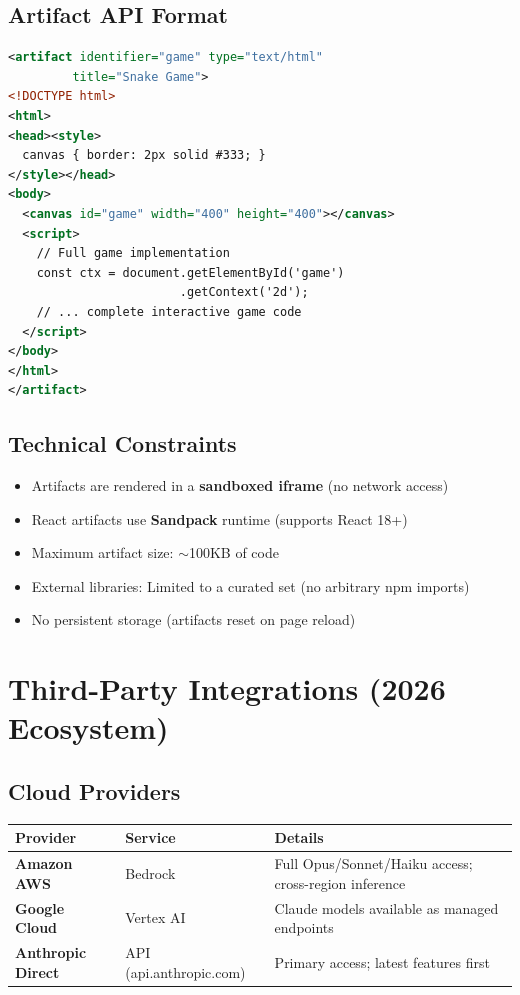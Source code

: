 \documentclass[11pt,a4paper]{article}
\begin{document}
\subsection{Artifact API Format}

\begin{lstlisting}[language=XML, caption={Artifact Generation (in Claude's response)}]
<artifact identifier="game" type="text/html" 
         title="Snake Game">
<!DOCTYPE html>
<html>
<head><style>
  canvas { border: 2px solid #333; }
</style></head>
<body>
  <canvas id="game" width="400" height="400"></canvas>
  <script>
    // Full game implementation
    const ctx = document.getElementById('game')
                        .getContext('2d');
    // ... complete interactive game code
  </script>
</body>
</html>
</artifact>
\end{lstlisting}

\subsection{Technical Constraints}

\begin{itemize}[itemsep=1pt]
  \item Artifacts are rendered in a \textbf{sandboxed iframe} (no network access)
  \item React artifacts use \textbf{Sandpack} runtime (supports React 18+)
  \item Maximum artifact size: $\sim$100KB of code
  \item External libraries: Limited to a curated set (no arbitrary npm imports)
  \item No persistent storage (artifacts reset on page reload)
\end{itemize}

\section{Third-Party Integrations (2026 Ecosystem)}

\subsection{Cloud Providers}

\begin{center}
\begin{tabular}{lL{4cm}L{5cm}}
\toprule
\textbf{Provider} & \textbf{Service} & \textbf{Details} \\
\midrule
\textbf{Amazon AWS} & Bedrock & Full Opus/Sonnet/Haiku access; cross-region inference \\
\textbf{Google Cloud} & Vertex AI & Claude models available as managed endpoints \\
\textbf{Anthropic Direct} & API (api.anthropic.com) & Primary access; latest features first \\
\bottomrule
\end{tabular}
\end{center}
\end{document}
